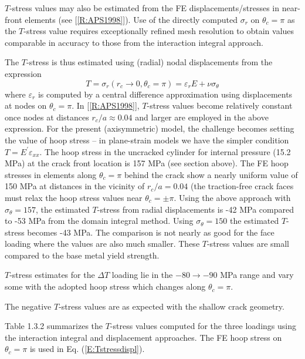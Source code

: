 \documentclass[11pt]{report}
\numberwithin{equation}{section}
\newcommand{\nid}{\noindent}
\newcommand{\vareps}{\varepsilon}
\begin{document}
$T$-stress values may also be estimated  from the FE 
displacements/stresses in near-front elements (see [\ref{R:APS1998}]). Use of the directly computed
$\sigma_r$ on $\theta_c=\pi$ as the $T$-stress value requires exceptionally refined mesh resolution to obtain
values comparable in accuracy to those from the interaction integral approach.

The $T$-stress is thus estimated using (radial) nodal displacements
from the expression
%
\begin{equation}\label{E:Tstressdispl}
T= \sigma_r ( r_c\rightarrow 0, \theta_c=\pi) = \vareps_r E + \nu \sigma_\theta
\end{equation}
%
\nid where $\vareps_r$ is computed by a central difference approximation
using displacements at nodes on $\theta_c=\pi$. In [\ref{R:APS1998}], $T$-stress
values become relatively constant once nodes at distances $r_c/a\approx 0.04$ 
and larger are employed
in the above expression. For the present (axisymmetric) model, the challenge becomes 
setting the value of hoop stress --
in plane-strain models we have the simpler condition $T=E^\prime \vareps_{xx}$. The
hoop stress in the uncracked cylinder for internal pressure (15.2 MPa) at the 
crack front location is 157 MPa (see section above). The FE hoop stresses in elements
along $\theta_c=\pi$ behind the crack show a nearly uniform value of 150 MPa at
distances in the vicinity of $r_c/a = 0.04$ (the traction-free crack faces
must relax the hoop stress values near $\theta_c=\pm \pi$.  Using the above approach with
$\sigma_\theta=157$, the estimated $T$-stress from radial displacements is -42 MPa
compared to -53 MPa from the domain integral method. Using $\sigma_\theta=150$
the estimated $T$-stress becomes  -43 MPa.  The comparison is 
not nearly as good for the face loading where the values are also much smaller.
These $T$-stress values are small compared
to the base metal yield strength. 

$T$-stress estimates for the $\Delta T$ loading lie
in the $-80 \rightarrow -90$ MPa range and vary some 
with the adopted hoop stress which changes
along $\theta_c=\pi$.

The negative $T$-stress values are as expected with the shallow crack geometry.

Table 1.3.2 summarizes the $T$-stress values computed for the three loadings using the
interaction integral and displacement approaches. The FE hoop stress on 
$\theta_c=\pi$ is used in Eq. (\ref{E:Tstressdispl}).
\end{document}
